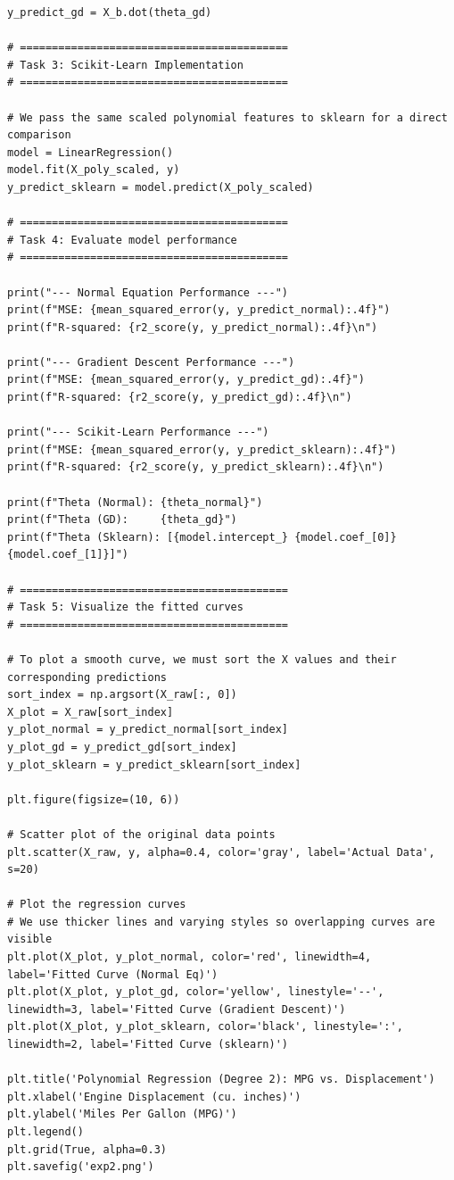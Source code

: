 \documentclass[11pt,a4paper]{article}
\begin{document}
\begin{lstlisting}
y_predict_gd = X_b.dot(theta_gd)

# ==========================================
# Task 3: Scikit-Learn Implementation
# ==========================================

# We pass the same scaled polynomial features to sklearn for a direct comparison
model = LinearRegression()
model.fit(X_poly_scaled, y)
y_predict_sklearn = model.predict(X_poly_scaled)

# ==========================================
# Task 4: Evaluate model performance
# ==========================================

print("--- Normal Equation Performance ---")
print(f"MSE: {mean_squared_error(y, y_predict_normal):.4f}")
print(f"R-squared: {r2_score(y, y_predict_normal):.4f}\n")

print("--- Gradient Descent Performance ---")
print(f"MSE: {mean_squared_error(y, y_predict_gd):.4f}")
print(f"R-squared: {r2_score(y, y_predict_gd):.4f}\n")

print("--- Scikit-Learn Performance ---")
print(f"MSE: {mean_squared_error(y, y_predict_sklearn):.4f}")
print(f"R-squared: {r2_score(y, y_predict_sklearn):.4f}\n")

print(f"Theta (Normal): {theta_normal}")
print(f"Theta (GD):     {theta_gd}")
print(f"Theta (Sklearn): [{model.intercept_} {model.coef_[0]} {model.coef_[1]}]")

# ==========================================
# Task 5: Visualize the fitted curves
# ==========================================

# To plot a smooth curve, we must sort the X values and their corresponding predictions
sort_index = np.argsort(X_raw[:, 0])
X_plot = X_raw[sort_index]
y_plot_normal = y_predict_normal[sort_index]
y_plot_gd = y_predict_gd[sort_index]
y_plot_sklearn = y_predict_sklearn[sort_index]

plt.figure(figsize=(10, 6))

# Scatter plot of the original data points
plt.scatter(X_raw, y, alpha=0.4, color='gray', label='Actual Data', s=20)

# Plot the regression curves
# We use thicker lines and varying styles so overlapping curves are visible
plt.plot(X_plot, y_plot_normal, color='red', linewidth=4, label='Fitted Curve (Normal Eq)')
plt.plot(X_plot, y_plot_gd, color='yellow', linestyle='--', linewidth=3, label='Fitted Curve (Gradient Descent)')
plt.plot(X_plot, y_plot_sklearn, color='black', linestyle=':', linewidth=2, label='Fitted Curve (sklearn)')

plt.title('Polynomial Regression (Degree 2): MPG vs. Displacement')
plt.xlabel('Engine Displacement (cu. inches)')
plt.ylabel('Miles Per Gallon (MPG)')
plt.legend()
plt.grid(True, alpha=0.3)
plt.savefig('exp2.png')
\end{lstlisting}
\end{document}
